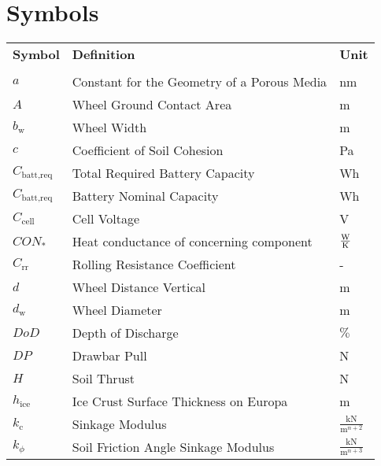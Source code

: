 \chapter*{Symbols}



\renewcommand{\arraystretch}{1.2}

\begin{longtable}[l]{lll}

	\textbf{Symbol}	&	\textbf{Definition}	\hspace{8cm}	&	\textbf{Unit}	\\ \\
	

\(a\)					&	Constant for the Geometry of a Porous Media	& nm							\\
\(A\)					&	Wheel Ground Contact Area					& m								\\
\(b_\text{w}\)			&	Wheel Width 								& m								\\
\(c\)					&	Coefficient of Soil Cohesion				& Pa							\\
$C_\text{batt,req}$		&	Total Required Battery Capacity				& Wh							\\
$C_\text{batt,req}$		&	Battery Nominal Capacity					& Wh							\\
$C_\text{cell}$			&	Cell Voltage								& V								\\
$CON_*$					&	Heat conductance of concerning component	& $\frac{{\rm W}}{{\rm K}}$				\\
\(C_\text{rr}\)			&	Rolling Resistance Coefficient					& -								\\	
\(d\)					&	Wheel Distance Vertical						& m								\\
\(d_\text{w}\)			&	Wheel Diameter								& m								\\
$DoD$					&	Depth of Discharge							& $\%$							\\
\(DP\)					&	Drawbar Pull								& N								\\
\(H\)					&	Soil Thrust									& N								\\
\(h_\text{ice}\)		&	Ice Crust Surface Thickness on Europa		&	m							\\
\(k_\text{c}\)			&	Sinkage Modulus								& \(\frac{\text{kN}}{\text{m}^{n+2}}\) \\
\(k_\phi\)				&	Soil Friction Angle Sinkage Modulus			& \(\frac{\text{kN}}{\text{m}^{n+3}}\) \\

\end{longtable}
